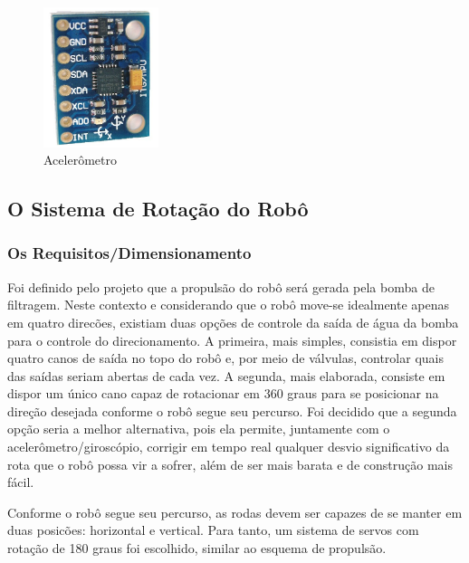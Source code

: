 \begin{description}
\par
\begin{figure}[h]
  \centering
  \includegraphics[width=0.3\textwidth]{figures/accelerometer.png}
  \caption{Acelerômetro \cite{arduino2016}}
  \label{fig:gpi}
\end{figure}
\FloatBarrier
\par
\end{description}

\subsection{O Sistema de Rotação do Robô}
\subsubsection{Os Requisitos/Dimensionamento}
Foi definido pelo projeto que a propulsão do robô será gerada pela bomba de filtragem. Neste contexto e considerando que o robô move-se idealmente apenas em quatro direcões, existiam duas opções de controle da saída de água da bomba para o controle do direcionamento. A primeira, mais simples, consistia em dispor quatro canos de saída no topo do robô e, por meio de válvulas, controlar quais das saídas seriam abertas de cada vez. A segunda, mais elaborada, consiste em dispor um único cano capaz de rotacionar em 360 graus para se posicionar na direção desejada conforme o robô segue seu percurso. Foi decidido que a segunda opção seria a melhor alternativa, pois ela permite, juntamente com o acelerômetro/giroscópio, corrigir em tempo real qualquer desvio significativo da rota que o robô possa vir a sofrer, além de ser mais barata e de construção mais fácil.

	Conforme o robô segue seu percurso, as rodas devem ser capazes de se manter em duas posicões: horizontal e vertical. Para tanto, um sistema de servos com rotação de 180 graus foi escolhido, similar ao esquema de propulsão.

